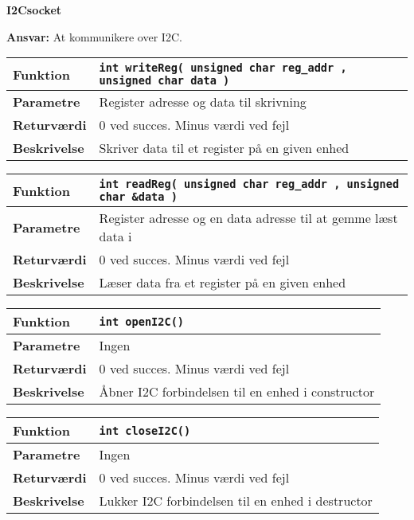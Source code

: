 {\centering
\textbf{I2Csocket}\par
}
\textbf{Ansvar:} At kommunikere over I2C. \

\begin{center}
    \begin{tabular}{ | l | p{} |}
    \hline
    \textbf{Funktion}	& \verb+int writeReg( unsigned char reg_addr , unsigned char data ) +	\\ \hline
    \textbf{Parametre} 	& Register adresse og data til skrivning	\\ \hline
    \textbf{Returværdi}	& 0 ved succes. Minus værdi ved fejl \\ \hline
    \textbf{Beskrivelse}	& Skriver data til et register på en given enhed \\ \hline
    \end{tabular}
\end{center}

\begin{center}
    \begin{tabular}{ | l | p{} |}
    \hline
    \textbf{Funktion}	& \verb+int readReg( unsigned char reg_addr , unsigned char &data ) +\\ \hline
    \textbf{Parametre} 	& Register adresse og en data adresse til at gemme læst data i\\ \hline
    \textbf{Returværdi}	& 0 ved succes. Minus værdi ved fejl\\ \hline
    \textbf{Beskrivelse}	& Læser data fra et register på en given enhed\\ \hline
    \end{tabular}
\end{center}

\begin{center}
    \begin{tabular}{ | l | p{} |}
    \hline
    \textbf{Funktion}	& \verb+int openI2C() + \\ \hline
    \textbf{Parametre} 	& Ingen \\ \hline
    \textbf{Returværdi}	& 0 ved succes. Minus værdi ved fejl \\ \hline
    \textbf{Beskrivelse}	& Åbner I2C forbindelsen til en enhed i constructor \\ \hline
    \end{tabular}
\end{center}

\begin{center}
    \begin{tabular}{ | l | p{} |}
    \hline
    \textbf{Funktion}	& \verb+int closeI2C() +\\ \hline
    \textbf{Parametre} 	& Ingen \\ \hline
    \textbf{Returværdi}	& 0 ved succes. Minus værdi ved fejl \\ \hline
    \textbf{Beskrivelse}	& Lukker I2C forbindelsen til en enhed i destructor\\ \hline
    \end{tabular}
\end{center}

